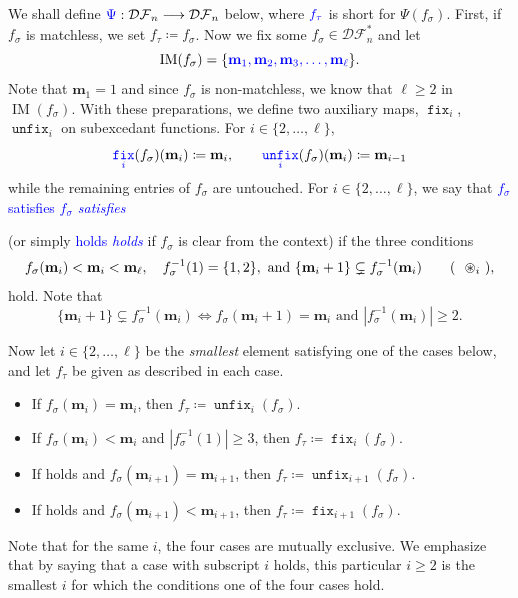 \documentclass[reqno]{amsart}
\theoremstyle{definition}
\newcommand{\defin}[1]{%
\relax\ifmmode%
\textcolor{blue}{#1}%
\else\textcolor{blue}{\emph{#1}}%
\fi%
}
\newcommand{\DSEF}{\mathcal{DF}}%
\newcommand{\fretherD}{\Psi}
\newcommand{\img}{\mathbf{m}}
\DeclareMathOperator{\supp}{IM}
\DeclareMathOperator{\fixMap}{\mathtt{fix}}
\DeclareMathOperator{\unfixMap}{\mathtt{unfix}}
\begin{document}
\bigskip 

We shall define $\defin{\fretherD}:\DSEF_n \longrightarrow \DSEF_n$ below,
where $\defin{f_{\tau}}$ is short for $\fretherD(f_{\sigma})$.
First, if $f_\sigma$ is matchless, we set $f_\tau\coloneqq f_\sigma$.
%
Now we fix some $f_{\sigma}\in \DSEF^*_n$ and 
let 
\begin{equation*}\label{eq:supp}
  \supp(f_{\sigma})=\{\defin{ \img_1, \img_2, \img_3, \dotsc, \img_{\ell} }\}.
\end{equation*}
 Note that $\img_1=1$ and  since $f_\sigma$ is non-matchless,
we know that $\ell \geq 2$ in $\supp(f_{\sigma})$.
%
With these preparations, we define two auxiliary maps, 
$\fixMap_i$, $\unfixMap_i$ on subexcedant functions.
For $i \in \{2,\dotsc,\ell\}$,
\begin{equation*}
   \defin{\fixMap_i}(f_\sigma)(\img_i) \coloneqq \img_i, \qquad 
   \defin{\unfixMap_i}(f_\sigma)(\img_{i}) \coloneqq\img_{i-1}
\end{equation*}
while the remaining entries of $f_\sigma$ are untouched.
%
For  $i \in \{2,\dotsc,\ell\}$, we say that \defin{$f_\sigma$ satisfies \eqCond[i]} 
(or simply \defin{\eqCond[i] holds} if $f_\sigma$ is clear from the context)
if the three conditions
\begin{equation}\label{eq:case34Conditions}
\begin{aligned}
  f_{\sigma}(\img_i) < \img_i < \img_\ell,\quad
  f^{-1}_\sigma(1) = \{1,2\}, \text{ and }
  \{\img_i + 1\}\subsetneq f^{-1}_\sigma(\img_i)
\end{aligned} \tag{\text{\eqCond[i]}},
\end{equation}
hold. 
Note that 
\[
  \{\img_i + 1\}\subsetneq f^{-1}_\sigma(\img_i) \iff 
  f_\sigma(\img_i + 1) = \img_i \text{ and } |f^{-1}_\sigma(\img_i)| \geq 2.
\]

\medskip 

Now let $i\in\{2,\dotsc,\ell\}$ be the \emph{smallest} element
satisfying one of the cases below,
and let $f_\tau$ be given as described in each case.
%
%
\begin{itemize}[leftmargin=2cm]
 \item[\textbf{Case \caseOne[i]:}] If $f_{\sigma}(\img_i) = \img_i$,
	then $f_\tau \coloneqq \unfixMap_i(f_\sigma)$.

 \item[\textbf{Case \caseTwo[i]:}] If $f_{\sigma}(\img_i) < \img_i$ and $|f^{-1}_\sigma(1)| \geq 3$,
 then $f_\tau \coloneqq \fixMap_i(f_\sigma)$.
 
 \item[\textbf{Case \caseThree[i]:}] \label{case3a} 
If \eqCond[i] holds and $f_\sigma(\img_{i+1}) = \img_{i+1}$, then
$
 f_\tau \coloneqq \unfixMap_{i+1}(f_\sigma).
$

\item[\textbf{Case \caseFour[i]:}] \label{case4} 
If \eqCond[i] holds and $f_\sigma(\img_{i+1}) < \img_{i+1}$, then
$
 f_\tau \coloneqq \fixMap_{i+1}(f_\sigma).
$
\end{itemize}
Note that for the same $i$, the four cases are mutually exclusive.
We emphasize that by saying that a case with subscript $i$ holds,
this particular $i \geq 2$ is the smallest $i$ for which the conditions one of the four cases hold.
\end{document}
